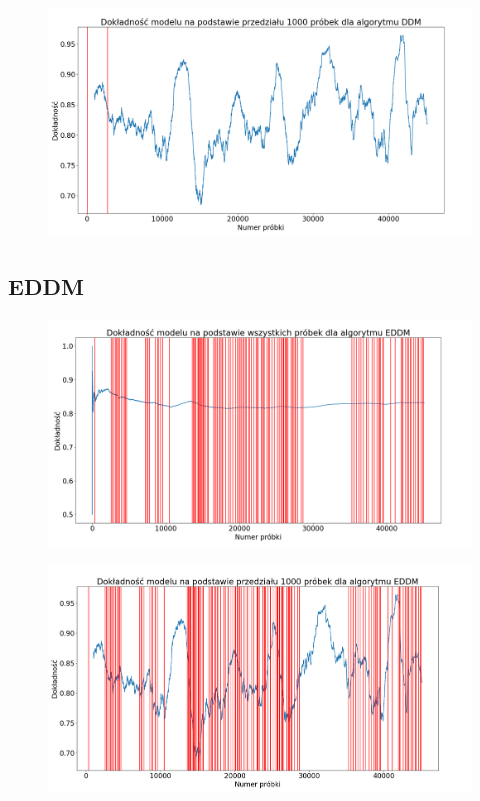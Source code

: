 \documentclass{classrep}
\begin{document}
\begin{figure}[H]
    \centering
    \includegraphics[width=1\textwidth]{resources/stage1/DDM_win.png}
    \label{DDMw}
\end{figure}

\subsection{EDDM}

\begin{figure}[H]
    \centering
    \includegraphics[width=1\textwidth]{resources/stage1/EDDM.png}
    \label{DDM}
\end{figure}

\begin{figure}[H]
    \centering
    \includegraphics[width=1\textwidth]{resources/stage1/EDDM_win.png}
    \label{DDMw}
\end{figure}
\end{document}

